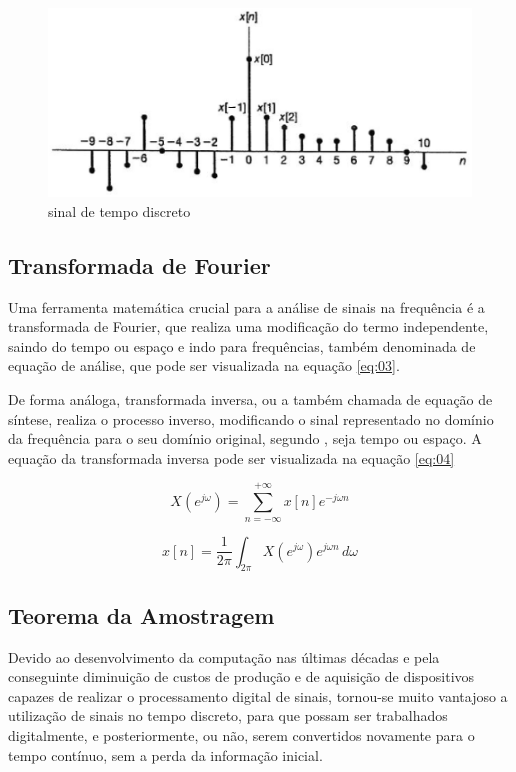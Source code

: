 \begin{figure}[h]
	\centering
    \includegraphics[scale=0.5]{figuras/fig02.eps}
	\caption{sinal de tempo discreto}
	\label{fig02}
\end{figure}

\subsection{Transformada de Fourier}
Uma ferramenta matemática crucial para a análise de sinais na frequência é a transformada de Fourier, que realiza uma modificação do termo independente, saindo do tempo ou espaço e indo para frequências, também denominada de equação de análise, que pode ser visualizada na equação \ref{eq:03}. \par De forma análoga, transformada inversa, ou a também chamada de equação de síntese, realiza o processo inverso, modificando o sinal representado no domínio da frequência para o seu domínio original, segundo \cite{oppenheim2010sinais}, seja tempo ou espaço. A equação da transformada inversa pode ser visualizada na equação \ref{eq:04}

\begin{equation}  \label{eq:03}
X(e^{j\omega})= \sum_{n=-\infty}^{+\infty} x[n]e^{-j\omega n}
\end{equation}

\begin{equation}  \label{eq:04}
x[n]=\frac{1}{2\pi} \int_{2\pi}^{} X(e^{j\omega})e^{j\omega n} \,d\omega
\end{equation}

\subsection{Teorema da Amostragem}
Devido ao desenvolvimento da computação nas últimas décadas e pela conseguinte diminuição de custos de produção e de aquisição de dispositivos capazes de realizar o processamento digital de sinais, tornou-se muito vantajoso a utilização de sinais no tempo discreto, para que possam ser trabalhados digitalmente, e posteriormente, ou não, serem convertidos novamente para o tempo contínuo, sem a perda da informação inicial. 


